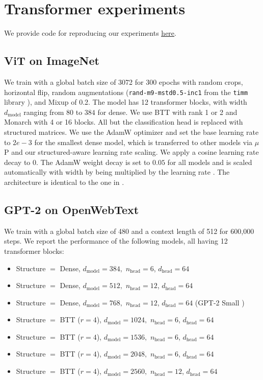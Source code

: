 \documentclass{article}
\theoremstyle{plain}
\theoremstyle{definition}
\theoremstyle{remark}
\newcommand{\mup}{$\mu$P\xspace}
\begin{document}
\section{Transformer experiments} \label{app:trans}
We provide code for reproducing our experiments \href{https://github.com/shikaiqiu/compute-better-spent}{\underline{here}}.
\subsection{ViT on ImageNet}
We train with a global batch size of 3072 for 300 epochs with random crops, horizontal flip, random augmentations (\texttt{rand-m9-mstd0.5-inc1} from the \texttt{timm} library \cite{rw2019timm}), and Mixup of 0.2. The model has 12 transformer blocks, with width $d_\mathrm{model}$ ranging from $80$ to $384$ for dense. We use BTT with rank 1 or 2 and Monarch with 4 or 16 blocks. All but the classification head is replaced with structured matrices. We use the AdamW optimizer and set the base learning rate to $2e-3$ for the smallest dense model, which is transferred to other models via \mup and our structured-aware learning rate scaling. We apply a cosine learning rate decay to $0.$ The AdamW weight decay is set to $0.05$ for all models and is scaled automatically with width by being multiplied by the learning rate \citep{yang2021v}. The architecture is identical to the one in .

\subsection{GPT-2 on OpenWebText}
We train with a global batch size of 480 and a context length of 512 for 600,000 steps. We report the performance of the following models, all having 12 transformer blocks:
\begin{itemize}
    \item Structure $=$ Dense, $d_\mathrm{model}=384,$ $n_\mathrm{head} = 6$, $d_\mathrm{head} = 64$
    \item Structure $=$ Dense, $d_\mathrm{model}=512,$ $n_\mathrm{head} = 12$, $d_\mathrm{head} = 64$
    \item Structure $=$ Dense, $d_\mathrm{model}=768,$ $n_\mathrm{head} = 12$, $d_\mathrm{head} = 64$ (GPT-2 Small \citep{radford2019gpt2})
    \item Structure $=$ BTT ($r=4$), $d_\mathrm{model}=1024,$ $n_\mathrm{head} = 6$, $d_\mathrm{head} = 64$
    \item Structure $=$ BTT ($r=4$), $d_\mathrm{model}=1536,$ $n_\mathrm{head} = 6$, $d_\mathrm{head} = 64$
    \item Structure $=$ BTT ($r=4$), $d_\mathrm{model}=2048,$ $n_\mathrm{head} = 6$, $d_\mathrm{head} = 64$
    \item Structure $=$ BTT ($r=4$), $d_\mathrm{model}=2560,$ $n_\mathrm{head} = 12$, $d_\mathrm{head} = 64$
\end{itemize}
\end{document}
